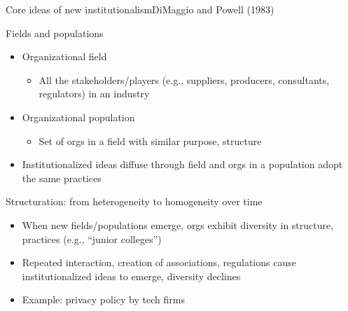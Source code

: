 \begin{frame}{Core ideas of new institutionalism}{DiMaggio and Powell (1983)}

	Fields and populations
	\begin{itemize}
		\item Organizational field
		\begin{itemize}
			\item All the stakeholders/players (e.g., suppliers, producers, consultants, regulators) in an  industry
		\end{itemize}
		\item Organizational population
		\begin{itemize}
			\item Set of orgs in a field with similar purpose, structure
		\end{itemize}
		\item Institutionalized ideas diffuse through field and orgs in a population adopt the same practices
	\end{itemize}	
	\vspace{2mm}
	Structuration: from heterogeneity to homogeneity over time
	\begin{itemize}
		\item When new fields/populations emerge, orgs exhibit diversity in structure, practices (e.g., ``junior colleges'')
		\item Repeated interaction, creation of associations, regulations cause institutionalized ideas to emerge, diversity declines
		\item Example: privacy policy by tech firms
	\end{itemize}
\end{frame}

\begin{comment}

\begin{frame}{Core ideas of new institutionalism}{Disagreements between Meyer/Rowan and DiMaggio/Powell}

	Meyer and Rowan (1977)
	\begin{itemize}
		\item highlights symbolic adoption to signal legitimacy to external environment; but technical core differs across orgs
	\end{itemize}
	\vspace{2mm}	
	DiMaggio and Powell (1983)
	\begin{itemize}
		\item (For mimetic and normative isomorphism) implicit assumption that adoption is substantive and internalized; we are all believers and orgs in a population really are the same
	\end{itemize}

\end{frame}

\end{comment}

